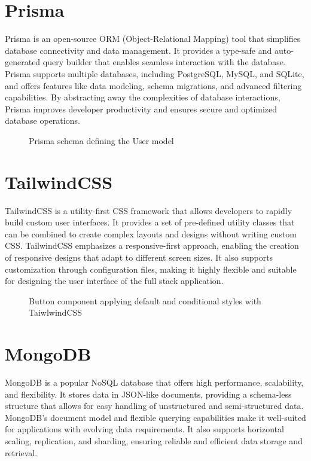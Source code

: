\section{Prisma}
Prisma is an open-source ORM (Object-Relational Mapping) tool that simplifies database connectivity and data management. It provides a type-safe and auto-generated query builder that enables seamless interaction with the database. Prisma supports multiple databases, including PostgreSQL, MySQL, and SQLite, and offers features like data modeling, schema migrations, and advanced filtering capabilities. By abstracting away the complexities of database interactions, Prisma improves developer productivity and ensures secure and optimized database operations.

\begin{figure}[!ht]
    
    \caption{Prisma schema defining the User model}\label{fig:prisma}
\end{figure}

\section{TailwindCSS}
TailwindCSS is a utility-first CSS framework that allows developers to rapidly build custom user interfaces. It provides a set of pre-defined utility classes that can be combined to create complex layouts and designs without writing custom CSS. TailwindCSS emphasizes a responsive-first approach, enabling the creation of responsive designs that adapt to different screen sizes. It also supports customization through configuration files, making it highly flexible and suitable for designing the user interface of the full stack application.

\begin{figure}[!ht]
    
    \caption{Button component applying default and conditional styles with TaiwlwindCSS}\label{fig:tailwind}
\end{figure}

\section{MongoDB}
MongoDB is a popular NoSQL database that offers high performance, scalability, and flexibility. It stores data in JSON-like documents, providing a schema-less structure that allows for easy handling of unstructured and semi-structured data. MongoDB's document model and flexible querying capabilities make it well-suited for applications with evolving data requirements. It also supports horizontal scaling, replication, and sharding, ensuring reliable and efficient data storage and retrieval.

